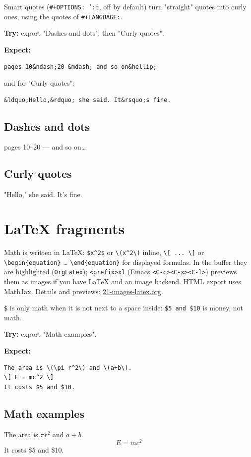 Smart quotes (\texttt{\#+OPTIONS: ':t}, off by default) turn "straight" quotes
into curly ones, using the quotes of \texttt{\#+LANGUAGE:}.

\textbf{Try:} export "Dashes and dots", then "Curly quotes".

\textbf{Expect:}
\begin{verbatim}
pages 10&ndash;20 &mdash; and so on&hellip;
\end{verbatim}
and for "Curly quotes":
\begin{verbatim}
&ldquo;Hello,&rdquo; she said. It&rsquo;s fine.
\end{verbatim}
\subsection{Dashes and dots}
\label{sec:orgcda24b4}
pages 10--20 --- and so on\ldots{}
\subsection{Curly quotes}
\label{sec:org14c171c}
"Hello," she said. It's fine.
\section{\LaTeX{} fragments}
\label{sec:org42f874c}
Math is written in \LaTeX{}: \texttt{\$x\textasciicircum{}2\$} or \texttt{\textbackslash{}(x\textasciicircum{}2\textbackslash{})} inline, \texttt{\textbackslash{}[ ... \textbackslash{}]} or
\texttt{\textbackslash{}begin\{equation\}} \ldots{} \texttt{\textbackslash{}end\{equation\}} for displayed formulas. In the
buffer they are highlighted (\texttt{OrgLatex}); \texttt{<prefix>xl} (Emacs
\texttt{<C-c><C-x><C-l>}) previews them as images if you have \LaTeX{} and an image
backend. HTML export uses MathJax. Details and previews:
\href{21-images-latex.org}{21-images-latex.org}.

\texttt{\$} is only math when it is not next to a space inside: \texttt{\$5 and \$10} is
money, not math.

\textbf{Try:} export "Math examples".

\textbf{Expect:}
\begin{verbatim}
The area is \(\pi r^2\) and \(a+b\).
\[ E = mc^2 \]
It costs $5 and $10.
\end{verbatim}
\subsection{Math examples}
\label{sec:org765f93b}
The area is \(\pi r^2\) and \(a+b\).
\[ E = mc^2 \]
It costs \$5 and \$10.
